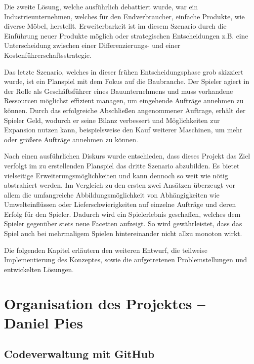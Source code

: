 Die zweite Lösung, welche ausführlich debattiert wurde, war ein Industrieunternehmen, welches für den Endverbraucher, einfache Produkte, wie diverse Möbel, herstellt. Erweiterbarkeit ist im diesem Szenario durch die Einführung neuer Produkte möglich oder strategischen Entscheidungen z.B. eine Unterscheidung zwischen einer Differenzierungs- und einer Kostenführerschaftsstrategie.

Das letzte Szenario, welches in dieser frühen Entscheidungsphase grob skizziert wurde, ist ein Planspiel mit dem Fokus auf die Baubranche. Der Spieler agiert in der Rolle als Geschäftsführer eines Bauunternehmens und muss vorhandene Ressourcen möglichst effizient managen, um eingehende Aufträge annehmen zu können. Durch das erfolgreiche Abschließen angenommener Auftrage, erhält der Spieler Geld, wodurch er seine Bilanz verbessert und Möglichkeiten zur Expansion nutzen kann, beispielsweise den Kauf weiterer Maschinen, um mehr oder größere Aufträge annehmen zu können. 

Nach einen ausführlichen Diskurs wurde entschieden, dass dieses Projekt das Ziel verfolgt im zu erstellenden Planspiel das dritte Szenario abzubilden. Es bietet vielseitige Erweiterungsmöglichkeiten und kann dennoch so weit wie nötig abstrahiert werden. Im Vergleich zu den ersten zwei Ansätzen überzeugt vor allem die umfangreiche Abbildungsmöglichkeit von Abhängigkeiten wie Umwelteinflüssen oder Lieferschwierigkeiten auf einzelne Aufträge und deren Erfolg für den Spieler. Dadurch wird ein Spielerlebnis geschaffen, welches dem Spieler gegenüber stets neue Facetten aufzeigt. So wird gewährleistet, dass das Spiel auch bei mehrmaligem Spielen hintereinander nicht allzu monoton wirkt.

Die folgenden Kapitel erläutern den weiteren Entwurf, die teilweise Implementierung des Konzeptes, sowie die aufgetretenen Problemstellungen und entwickelten Lösungen.

\section{Organisation des Projektes -- Daniel Pies}

\subsection{Codeverwaltung mit GitHub}

